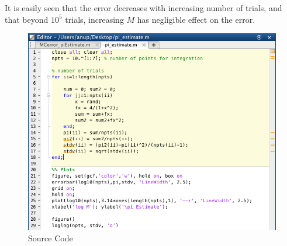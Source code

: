 \documentclass[12pt, oneside]{article}   	%
\begin{document}
	It is easily seen that the error decreases with increasing number of trials, and that beyond $10^5$ trials, increasing $M$ has negligible effect on the error.	
	\begin{figure} [!htbp]
	\centering
	 \includegraphics[scale=0.5]{pi_MCestimate_code.jpg}
	\caption{Source Code}
	\end{figure}
\end{document}
